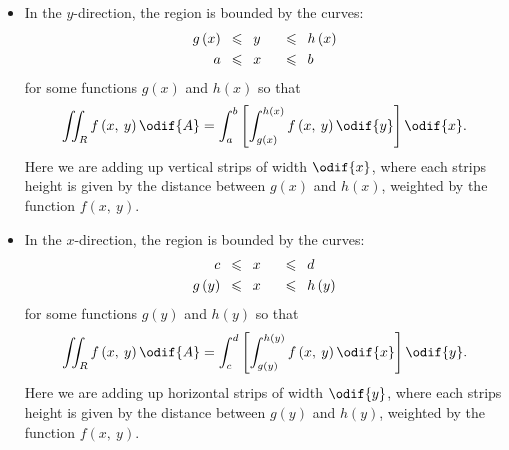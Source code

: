 \documentclass{article}
\begin{document}
\begin{itemize}
    \item In the \(y\)-direction, the region is bounded by the curves:
          \begin{alignat*}{2}
              g\left( x \right) & \hspace{0.5em} \leqslant \hspace{0.5em} y &  & \hspace{0.5em} \leqslant \hspace{0.5em} h\left( x \right) \\
              a                 & \hspace{0.5em} \leqslant \hspace{0.5em} x &  & \hspace{0.5em} \leqslant \hspace{0.5em} b
          \end{alignat*}
          for some functions \(g\left( x \right)\) and \(h\left( x \right)\)
          so that
          \begin{equation*}
              \iint_{R} f\left( x, \: y \right) \odif{A} = \int_a^b \left[ \int_{g\left( x \right)}^{h\left( x \right)} f\left( x, \: y \right) \odif{y} \right] \odif{x}.
          \end{equation*}
          Here we are adding up vertical strips of width \(\odif{x}\),
          where each strips height is given by the distance between
          \(g\left( x \right)\) and \(h\left( x \right)\), weighted by
          the function \(f\left( x, \: y \right)\).
    \item In the \(x\)-direction, the region is bounded by the curves:
          \begin{alignat*}{2}
              c                 & \hspace{0.5em} \leqslant \hspace{0.5em} x &  & \hspace{0.5em} \leqslant \hspace{0.5em} d                 \\
              g\left( y \right) & \hspace{0.5em} \leqslant \hspace{0.5em} x &  & \hspace{0.5em} \leqslant \hspace{0.5em} h\left( y \right)
          \end{alignat*}
          for some functions \(g\left( y \right)\) and \(h\left( y \right)\)
          so that
          \begin{equation*}
              \iint_{R} f\left( x, \: y \right) \odif{A} = \int_c^d \left[ \int_{g\left( y \right)}^{h\left( y \right)} f\left( x, \: y \right) \odif{x} \right] \odif{y}.
          \end{equation*}
          Here we are adding up horizontal strips of width \(\odif{y}\),
          where each strips height is given by the distance between
          \(g\left( y \right)\) and \(h\left( y \right)\), weighted by
          the function \(f\left( x, \: y \right)\).
\end{itemize}
\end{document}
